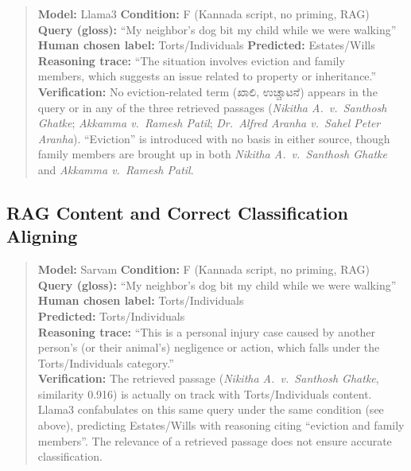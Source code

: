 \documentclass[11pt]{article}
\begin{document}
\begin{quote}
\textbf{Model:} Llama3 \quad \textbf{Condition:} F (Kannada script, no priming, RAG) \\
\textbf{Query (gloss):} ``My neighbor's dog bit my child while we were walking'' \\
\textbf{Human chosen label:} Torts/Individuals \quad \textbf{Predicted:} Estates/Wills \\
\textbf{Reasoning trace:} ``The situation involves eviction and family \\
members, which suggests an issue related to property or inheritance.'' \\
\textbf{Verification:} No eviction-related term
({\kannadafont ಖಾಲಿ}, {\kannadafont ಉಚ್ಚಾಟನೆ}) appears in the query or in
any of the three retrieved passages (\textit{Nikitha A.\ v.\ Santhosh
Ghatke}; \textit{Akkamma v.\ Ramesh Patil}; \textit{Dr.\ Alfred Aranha
v.\ Sahel Peter Aranha}). ``Eviction'' is introduced with no basis in
either source, though family members are brought up in both \textit{Nikitha A.\ v.\ Santhosh Ghatke} and \textit{Akkamma v.\ Ramesh Patil}.
\end{quote}

\subsection{RAG Content and Correct Classification Aligning}
\label{app:aligning}

\begin{quote}
\textbf{Model:} Sarvam \quad \textbf{Condition:} F (Kannada script, no priming, RAG) \\
\textbf{Query (gloss):} ``My neighbor's dog bit my child while we were walking'' \\
\textbf{Human chosen label:} Torts/Individuals \\
\quad \textbf{Predicted:} Torts/Individuals \\
\textbf{Reasoning trace:} ``This is a personal injury case caused by another person's (or their animal's) negligence or action, which falls under the Torts/Individuals category.'' \\
\textbf{Verification:} The retrieved passage (\textit{Nikitha A.\ v.\ Santhosh Ghatke}, similarity 0.916) is actually on track with Torts/Individuals content. Llama3 confabulates on this same query under the same condition (see above), predicting Estates/Wills with reasoning citing ``eviction and family members''. The relevance of a retrieved passage does not ensure accurate classification.
\end{quote}
\end{document}
